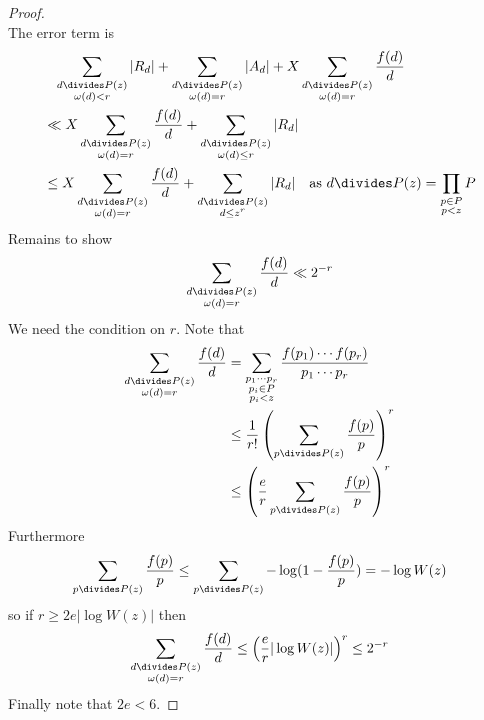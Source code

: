 \documentclass[a4paper]{article}
\begin{document}
\begin{proof}
\[  \]
  The error term is
  \begin{align*}
    &\phantom{=} \sum_{\substack{d \divides P(z) \\ \omega(d) < r}} |R_d| + \sum_{\substack{d \divides P(z) \\ \omega(d) = r}} |A_d| + X \sum_{\substack{d \divides P(z) \\ \omega(d) = r}} \frac{f(d)}{d} \\
    &\ll X \sum_{\substack{d \divides P(z) \\ \omega(d) = r}} \frac{f(d)}{d} + \sum_{\substack{d \divides P(z) \\ \omega(d) \leq r}} |R_d| \\
    &\leq X \sum_{\substack{d \divides P(z) \\ \omega(d) = r}} \frac{f(d)}{d} +\sum_{\substack{d \divides P(z) \\ d \leq z^r}} |R_d| \quad \text{as }
    d \divides P(z) = \prod_{\substack{p \in P \\ p < z}} P
  \end{align*}
  Remains to show
  \[
    \sum_{\substack{d \divides P(z) \\\omega(d) = r}} \frac{f(d)}{d} \ll 2^{-r}
  \]
  We need the condition on \(r\). Note that
  \begin{align*}
    \sum_{\substack{d \divides P(z) \\\omega(d) = r}} \frac{f(d)}{d}
    &= \sum_{\substack{p_1 \cdots p_r \\ p_i \in P \\ p_i < z}} \frac{f(p_1) \cdots f(p_r)}{p_1 \cdots p_r} \\
    &\leq \frac{1}{r!} \left( \sum_{p \divides P(z)} \frac{f(p)}{p} \right)^r \\
    &\leq \left( \frac{e}{r} \sum_{p \divides P(z)} \frac{f(p)}{p} \right)^r \\
  \end{align*}
  Furthermore
  \[
    \sum_{p \divides P(z)} \frac{f(p)}{p}
    \leq \sum_{p \divides P(z)} - \log(1 - \frac{f(p)}{p})
    = - \log W(z)
  \]
  so if \(r \geq 2 e |\log W(z)|\) then
  \[
    \sum_{\substack{d \divides P(z) \\\omega(d) = r}} \frac{f(d)}{d}
    \leq \left( \frac{e}{r} |\log W(z)| \right)^r
    \leq 2^{-r}
  \]
  Finally note that \(2e < 6\).
\end{proof}
\end{document}
